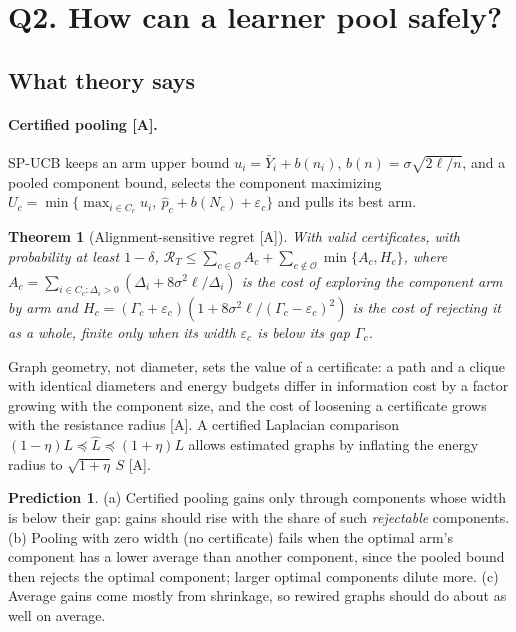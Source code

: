 \documentclass[11pt]{article}
\newtheorem{theorem}{Theorem}
\theoremstyle{definition}
\newtheorem{prediction}{Prediction}
\theoremstyle{remark}
\newcommand{\src}[1]{\textsf{[#1]}}
\begin{document}
\section{Q2. How can a learner pool safely?}\label{sec:q2}

\subsection{What theory says}

\paragraph{Certified pooling \src{A}.} SP-UCB keeps an arm upper bound $u_i=\bar Y_i+b(n_i)$, $b(n)=\sigma\sqrt{2\ell/n}$, and a pooled component bound, selects the component maximizing $U_c=\min\{\max_{i\in C_c}u_i,\ \hat p_c+b(N_c)+\varepsilon_c\}$ and pulls its best arm.

\begin{theorem}[Alignment-sensitive regret \src{A}]\label{thm:spucb}
With valid certificates, with probability at least $1-\delta$,
$\mathcal R_T\le\sum_{c\in\mathcal O}A_c+\sum_{c\notin\mathcal O}\min\{A_c,H_c\}$, where $A_c=\sum_{i\in C_c:\Delta_i>0}(\Delta_i+8\sigma^2\ell/\Delta_i)$ is the cost of exploring the component arm by arm and $H_c=(\Gamma_c+\varepsilon_c)(1+8\sigma^2\ell/(\Gamma_c-\varepsilon_c)^2)$ is the cost of rejecting it as a whole, finite only when its width $\varepsilon_c$ is below its gap $\Gamma_c$.
\end{theorem}

Graph geometry, not diameter, sets the value of a certificate: a path and a clique with identical diameters and energy budgets differ in information cost by a factor growing with the component size, and the cost of loosening a certificate grows with the resistance radius \src{A}. A certified Laplacian comparison $(1-\eta)L\preceq\hat L\preceq(1+\eta)L$ allows estimated graphs by inflating the energy radius to $\sqrt{1+\eta}\,S$ \src{A}.

\begin{prediction}\label{pred:q2}
(a) Certified pooling gains only through components whose width is below their gap: gains should rise with the share of such \emph{rejectable} components. (b) Pooling with zero width (no certificate) fails when the optimal arm's component has a lower average than another component, since the pooled bound then rejects the optimal component; larger optimal components dilute more. (c) Average gains come mostly from shrinkage, so rewired graphs should do about as well on average.
\end{prediction}
\end{document}
